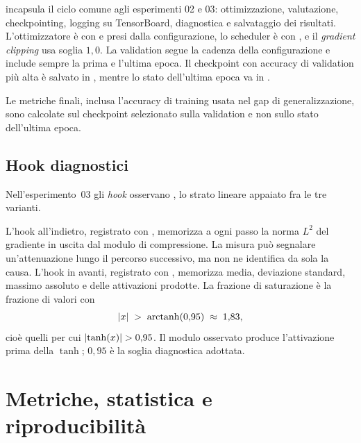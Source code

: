  incapsula il ciclo comune agli esperimenti 02 e 03:
ottimizzazione, valutazione, checkpointing, logging su TensorBoard, diagnostica e
salvataggio dei risultati. L'ottimizzatore è  con
 e  presi dalla configurazione, lo
scheduler è  con , e il
\emph{gradient clipping} usa soglia $1{,}0$. La validation segue la cadenza della
configurazione e include sempre la prima e l'ultima epoca. Il checkpoint con
accuracy di validation più alta è salvato in , mentre lo
stato dell'ultima epoca va in .

\begin{limite}
Le metriche finali, inclusa l'accuracy di training usata nel gap di
generalizzazione, sono calcolate sul checkpoint selezionato sulla validation e
non sullo stato dell'ultima epoca.
\end{limite}

\subsection{Hook diagnostici}
\label{ssec:hook}

Nell'esperimento~03 gli \emph{hook} osservano
, lo strato lineare appaiato fra le tre
varianti.

L'hook all'indietro, registrato con ,
memorizza a ogni passo la norma $L^2$ del gradiente in uscita dal modulo di
compressione. La misura può segnalare un'attenuazione lungo il percorso
successivo, ma non ne identifica da sola la causa. L'hook in avanti, registrato
con , memorizza media,
deviazione standard, massimo assoluto e  delle attivazioni
prodotte. La frazione di saturazione è la frazione di valori con
\begin{equation}
  \lvert x \rvert \;>\; \operatorname{arctanh}(0{,}95) \;\approx\; 1{,}83 ,
  \label{eq:saturazione}
\end{equation}
cioè quelli per cui $\lvert \tanh(x) \rvert > 0{,}95$. Il modulo osservato produce
l'attivazione prima della $\tanh$; $0{,}95$ è la soglia diagnostica adottata.

\section{Metriche, statistica e riproducibilità}
\label{sec:analisi-statistica}

